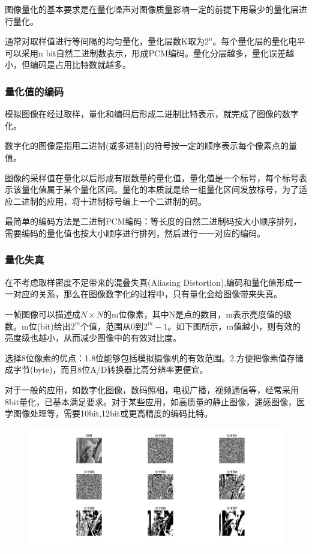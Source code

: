 \documentclass[11pt]{article}
\begin{document}
图像量化的基本要求是在量化噪声对图像质量影响一定的前提下用最少的量化层进行量化。

通常对取样值进行等间隔的均匀量化，量化层数K取为$2^n$。每个量化层的量化电平可以采用n bit自然二进制数表示，形成PCM编码。量化分层越多，量化误差越小，但编码是占用比特数就越多。

\subsubsection{量化值的编码}
模拟图像在经过取样，量化和编码后形成二进制比特表示，就完成了图像的数字化。

数字化的图像是指用二进制(或多进制)的符号按一定的顺序表示每个像素点的量值。

图像的采样值在量化以后形成有限数量的量化值，量化值是一个标号，每个标号表示该量化值属于某个量化区间。量化的本质就是给一组量化区间发放标号，为了适应二进制的应用，将十进制标号编上一个二进制的码。

最简单的编码方法是二进制PCM编码：等长度的自然二进制码按大小顺序排列，需要编码的量化值也按大小顺序进行排列，然后进行一一对应的编码。

\subsubsection{量化失真}

在不考虑取样密度不足带来的混叠失真(Aliasing Distortion),编码和量化值形成一一对应的关系，那么在图像数字化的过程中，只有量化会给图像带来失真。

一帧图像可以描述成$N\times N$的m位像素，其中N是点的数目，m表示亮度值的级数。m位(bit)给出$2^m$个值，范围从0到$2^m-1$。如下图所示，m值越小，则有效的亮度级也越小，从而减少图像中的有效对比度。

选择8位像素的优点：1.8位能够包括模拟摄像机的有效范围。2.方便把像素值存储成字节(byte)，而且8位A/D转换器比高分辨率更便宜。

对于一般的应用，如数字化图像，数码照相，电视广播，视频通信等，经常采用8bit量化，已基本满足要求。对于某些应用，如高质量的静止图像，遥感图像，医学图像处理等，需要10bit,12bit或更高精度的编码比特。
\begin{figure}[H]
	\includegraphics[scale = 0.4]{11}
\end{figure}
\end{document}
